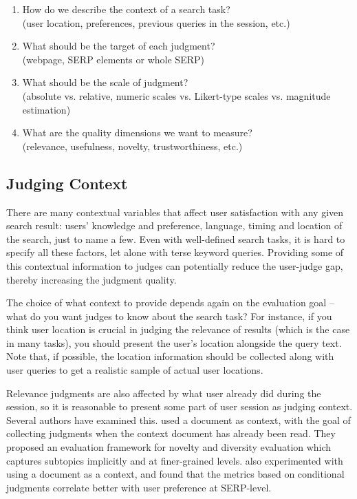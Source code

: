 \begin{enumerate}
	\item  How do we describe the context of a search task? \\(user location, preferences, previous queries in the session, etc.)
	\item  What should be the target of each judgment? \\(webpage, SERP elements or whole SERP)
	\item  What should be the scale of judgment? \\(absolute vs. relative, numeric scales vs. Likert-type scales vs. magnitude estimation)	
	\item  What are the quality dimensions we want to measure? \\(relevance, usefulness, novelty, trustworthiness, etc.)
\end{enumerate}

\subsection{Judging Context}
\label{s:judging-context}
There are many contextual variables that affect user satisfaction with any given search result: users' knowledge and preference, language, timing and location of the search, just to name a few. Even with well-defined search tasks, it is hard to specify all these factors, let alone with terse keyword queries. Providing some of this contextual information to judges can potentially reduce the user-judge gap, thereby increasing the judgment quality.  

The choice of what context to provide depends again on the evaluation goal -- what do you want judges to know about the search task? For instance, if you think user location is crucial in judging the relevance of results (which is the case in many tasks), you should present the user's location alongside the query text. Note that, if possible, the location information should be collected along with user queries to get a realistic sample of actual user locations.

Relevance judgments are also affected by what user already did during the session, so it is reasonable to present some part of user session as judging context. Several authors have examined this. \cite{Chandar2013} used a document as context, with the goal of collecting judgments when the context document has already been read. They proposed an evaluation framework for novelty and diversity evaluation which captures subtopics implicitly and at finer-grained levels. \cite{Golbus:2014:CDR} also experimented with using a document as a context, and found that the metrics based on conditional judgments correlate better with user preference at SERP-level. 

